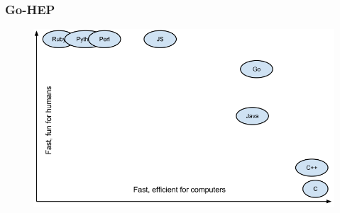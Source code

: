 \documentclass[9pt]{beamer}
\begin{document}
\begin{frame}[fragile]
\frametitle{Go-HEP}

\begin{figure}[h]
\begin{center}
\includegraphics[width=\textwidth]{_figs/funfast.png}
\end{center}

\end{figure}

\end{frame}
\end{document}
